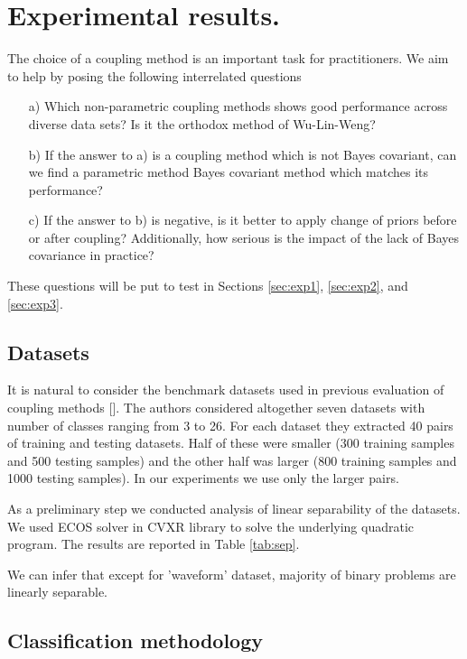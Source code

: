 \documentclass[twoside,11pt]{article}
\begin{document}
\section{Experimental results.}

The choice of a coupling method is an important task for practitioners. We aim to help by posing the following interrelated questions 

\begin{itemize}
\item[a)] Which non-parametric coupling methods shows good performance across diverse data sets? Is it the orthodox method of Wu-Lin-Weng?
\item[b)] If the answer to a) is a coupling method which is not Bayes covariant, can we find a parametric method Bayes covariant method which  matches its performance?
\item[c)] If the answer to b) is negative, is it better to apply change of priors before or after coupling? Additionally, how serious is the impact of the lack of Bayes covariance in practice?
\end{itemize}

These questions will be put to test in Sections \ref{sec:exp1}, \ref{sec:exp2}, and \ref{sec:exp3}.

\subsection{Datasets}

It is natural to consider the benchmark datasets used in previous evaluation of coupling methods [\cite{wu2004probability}]. The authors considered altogether seven datasets with number of classes ranging from 3 to 26. For each dataset they extracted 40 pairs of training and testing datasets. Half of these were smaller (300 training samples and 500 testing samples) and the other half was larger (800 training samples and 1000 testing samples). In our experiments we use only the larger pairs. 

As a preliminary step we conducted analysis of linear separability of the datasets. We used ECOS solver in CVXR library to solve the underlying quadratic program. The results are reported in Table \ref{tab:sep}.



We can infer that except for 'waveform' dataset, majority of binary problems are linearly separable.

\subsection{Classification methodology}
\end{document}
